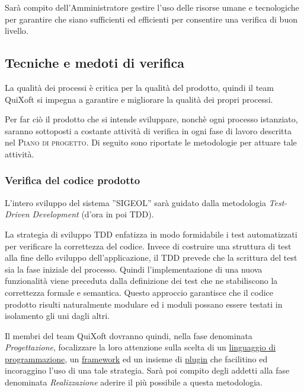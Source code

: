 \documentclass[11pt,a4paper]{article}
\begin{document}
Sarà compito dell'Amministratore gestire l'uso delle risorse umane e tecnologiche per garantire che siano sufficienti ed efficienti per consentire una verifica di buon livello.
\subsection{Tecniche e medoti di verifica}
La qualità dei processi è critica per la qualità del prodotto, quindi il team QuiXoft si impegna a garantire e migliorare la qualità dei propri processi.

Per far ciò il prodotto che si intende sviluppare, nonchè ogni processo istanziato, saranno sottoposti a costante attività di verifica in ogni fase di lavoro descritta nel \textsc{Piano di progetto}. Di seguito sono riportate le metodologie per attuare tale attività.
\subsubsection{Verifica del codice prodotto} \label{TDD}
L'intero sviluppo del sistema ''SIGEOL'' sarà guidato dalla metodologia \textit{Test-Driven Development} (d'ora in poi TDD).

La strategia di sviluppo TDD enfatizza in modo formidabile i test automatizzati per verificare la correttezza del codice. Invece di costruire una struttura di test alla fine dello sviluppo dell’applicazione, il TDD prevede che la scrittura del test sia la fase iniziale del processo. Quindi l’implementazione di una nuova funzionalità viene preceduta dalla definizione dei test che ne stabiliscono la correttezza formale e semantica. Questo approccio garantisce che il codice prodotto risulti naturalmente modulare ed i moduli possano essere testati in isolamento gli uni dagli altri.

Il membri del team QuiXoft dovranno quindi, nella fase denominata \textit{Proget\-tazione}, focalizzare la loro attenzione sulla scelta di un \underline{linguaggio di} \underline{programmazione}, un \underline{framework} ed un insieme di \underline{plugin} che facilitino ed incoraggino l'uso di una tale strategia. Sarà poi compito degli addetti alla fase denominata \textit{Realizzazione} aderire il più possibile a questa metodologia.
\end{document}
